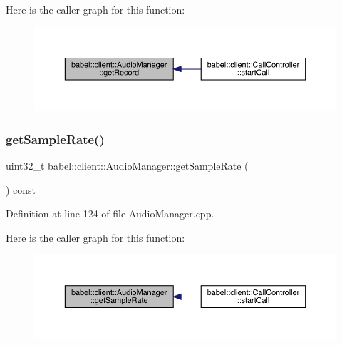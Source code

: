 Here is the caller graph for this function\+:\nopagebreak
\begin{figure}[H]
\begin{center}
\leavevmode
\includegraphics[width=350pt]{classbabel_1_1client_1_1_audio_manager_abe6f93340f16c366d6e2a447f8f32965_icgraph}
\end{center}
\end{figure}
\mbox{\label{classbabel_1_1client_1_1_audio_manager_a6e370c5b51c74ee31a81cc7ec1cdadb2}} 
\subsubsection{\texorpdfstring{get\+Sample\+Rate()}{getSampleRate()}}
{\footnotesize\ttfamily uint32\+\_\+t babel\+::client\+::\+Audio\+Manager\+::get\+Sample\+Rate (\begin{DoxyParamCaption}{ }\end{DoxyParamCaption}) const}



Definition at line 124 of file Audio\+Manager.\+cpp.

Here is the caller graph for this function\+:\nopagebreak
\begin{figure}[H]
\begin{center}
\leavevmode
\includegraphics[width=350pt]{classbabel_1_1client_1_1_audio_manager_a6e370c5b51c74ee31a81cc7ec1cdadb2_icgraph}
\end{center}
\end{figure}
\mbox{\label{classbabel_1_1client_1_1_audio_manager_a5c3a8d97a0330be03407f8c45b7f875e}} 
